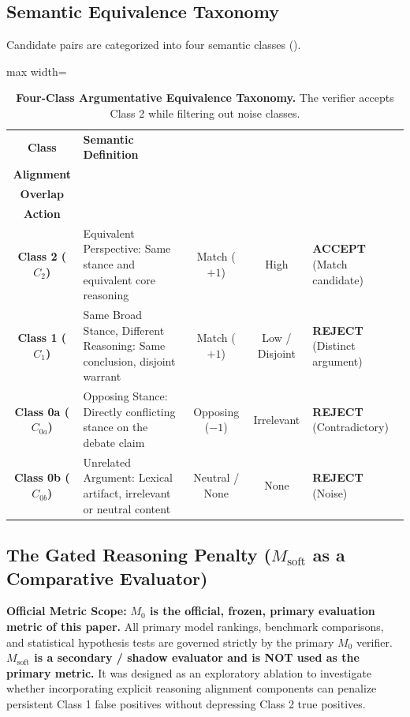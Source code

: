 \documentclass[11pt,a4paper]{article}
\begin{document}
\subsection{Semantic Equivalence Taxonomy}
Candidate pairs are categorized into four semantic classes ().

\begin{table}[htbp]
\centering
\small
\caption{\textbf{Four-Class Argumentative Equivalence Taxonomy.} The verifier accepts Class 2 while filtering out noise classes.}
\label{tab:taxonomy}
\begin{adjustbox}{max width=\linewidth}
\begin{tabular}{c p{3.2cm} c c p{2.2cm}}
\toprule
\textbf{Class} & \textbf{Semantic Definition} & \makecell{\textbf{Stance}\\\textbf{Alignment}} & \makecell{\textbf{Reasoning}\\\textbf{Overlap}} & \makecell{\textbf{Verifier}\\\textbf{Action}} \\
\midrule
\textbf{Class 2 ($C_2$)} & Equivalent Perspective: Same stance and equivalent core reasoning & Match ($+1$) & High & \textbf{ACCEPT} (Match candidate) \\
\addlinespace
\textbf{Class 1 ($C_1$)} & Same Broad Stance, Different Reasoning: Same conclusion, disjoint warrant & Match ($+1$) & Low / Disjoint & \textbf{REJECT} (Distinct argument) \\
\addlinespace
\textbf{Class 0a ($C_{0a}$)} & Opposing Stance: Directly conflicting stance on the debate claim & Opposing ($-1$) & Irrelevant & \textbf{REJECT} (Contradictory) \\
\addlinespace
\textbf{Class 0b ($C_{0b}$)} & Unrelated Argument: Lexical artifact, irrelevant or neutral content & Neutral / None & None & \textbf{REJECT} (Noise) \\
\bottomrule
\end{tabular}
\end{adjustbox}
\end{table}

\subsection{The Gated Reasoning Penalty ($M_{\text{soft}}$ as a Comparative Evaluator)}
\label{subsec:m_soft}

\begin{tcolorbox}
\textbf{Official Metric Scope:} \textbf{$M_0$ is the official, frozen, primary evaluation metric of this paper.} All primary model rankings, benchmark comparisons, and statistical hypothesis tests are governed strictly by the primary $M_0$ verifier. \textbf{$M_{\text{soft}}$ is a secondary / shadow evaluator and is NOT used as the primary metric.} It was designed as an exploratory ablation to investigate whether incorporating explicit reasoning alignment components can penalize persistent Class 1 false positives without depressing Class 2 true positives.
\end{tcolorbox}
\end{document}
